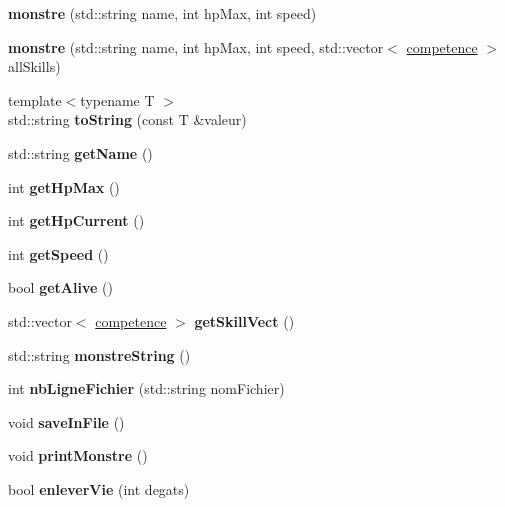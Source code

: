 \begin{DoxyCompactItemize}
\item 
\mbox{\label{classmonstre_a3a6290dca4b99876fe846e02e4ce140d}} 
{\bfseries monstre} (std\+::string name, int hp\+Max, int speed)
\item 
\mbox{\label{classmonstre_ab28517ab4e9898d3d079f2caa7cc5953}} 
{\bfseries monstre} (std\+::string name, int hp\+Max, int speed, std\+::vector$<$ \hyperlink{classcompetence}{competence} $>$ all\+Skills)
\item 
\mbox{\label{classmonstre_aea06290b33132d84afffd3f40f651891}} 
{\footnotesize template$<$typename T $>$ }\\std\+::string {\bfseries to\+String} (const T \&valeur)
\item 
\mbox{\label{classmonstre_ae166adf286161a19ee0bc8e5c14fc8f5}} 
std\+::string {\bfseries get\+Name} ()
\item 
\mbox{\label{classmonstre_aefac39c9ae67b300c2a69bfdd29662b2}} 
int {\bfseries get\+Hp\+Max} ()
\item 
\mbox{\label{classmonstre_a5cda5112e283bc62d0a8a2d8c21885e2}} 
int {\bfseries get\+Hp\+Current} ()
\item 
\mbox{\label{classmonstre_a0177c6bac35608e9c940de2550f0b3be}} 
int {\bfseries get\+Speed} ()
\item 
\mbox{\label{classmonstre_a7b92c8b92f0e30c4e90b6e797124a841}} 
bool {\bfseries get\+Alive} ()
\item 
\mbox{\label{classmonstre_a9529ed40be5fc8a806a7ae0287995ff1}} 
std\+::vector$<$ \hyperlink{classcompetence}{competence} $>$ {\bfseries get\+Skill\+Vect} ()
\item 
\mbox{\label{classmonstre_a70fd98734f8ce2ae1e856c7d9194e89d}} 
std\+::string {\bfseries monstre\+String} ()
\item 
\mbox{\label{classmonstre_a7591cd207cd1bee68ca79ce489f41ce2}} 
int {\bfseries nb\+Ligne\+Fichier} (std\+::string nom\+Fichier)
\item 
\mbox{\label{classmonstre_ad3d2efc38609b3857e542423809a566d}} 
void {\bfseries save\+In\+File} ()
\item 
\mbox{\label{classmonstre_aeb60395664bbca7846e037b058b5c716}} 
void {\bfseries print\+Monstre} ()
\item 
\mbox{\label{classmonstre_af5b61c4c0e2118760ce6f610bf9349e2}} 
bool {\bfseries enlever\+Vie} (int degats)
\end{DoxyCompactItemize}
